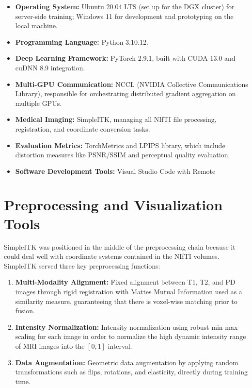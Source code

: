 \begin{itemize}
    \item \textbf{Operating System:} Ubuntu 20.04 LTS (set up for the DGX cluster) for server-side training; Windows 11 for development and prototyping on the local machine.
    \item \textbf{Programming Language:} Python 3.10.12.
    \item \textbf{Deep Learning Framework:} PyTorch 2.9.1, built with CUDA 13.0 and cuDNN 8.9 integration.
    \item \textbf{Multi-GPU Communication:} NCCL (NVIDIA Collective Communications Library), responsible for orchestrating distributed gradient aggregation on multiple GPUs.
    \item \textbf{Medical Imaging:} SimpleITK, managing all NIfTI file processing, registration, and coordinate conversion tasks.
    \item \textbf{Evaluation Metrics:} TorchMetrics and LPIPS library, which include distortion measures like PSNR/SSIM and perceptual quality evaluation.
    \item \textbf{Software Development Tools:} Visual Studio Code with Remote
\end{itemize}

\section{Preprocessing and Visualization Tools}
SimpleITK was positioned in the middle of the preprocessing chain because it could deal well with coordinate systems contained in the NIfTI volumes. SimpleITK served three key preprocessing functions:

\begin{enumerate}
    \item \textbf{Multi-Modality Alignment:} Fixed alignment between T1, T2, and PD images through rigid registration with Mattes Mutual Information used as a similarity measure, guaranteeing that there is voxel-wise matching prior to fusion.
    \item \textbf{Intensity Normalization:} Intensity normalization using robust min-max scaling for each image in order to normalize the high dynamic intensity range of MRI images into the $[0, 1]$ interval.
    \item \textbf{Data Augmentation:} Geometric data augmentation by applying random transformations such as flips, rotations, and elasticity, directly during training time.
\end{enumerate}

